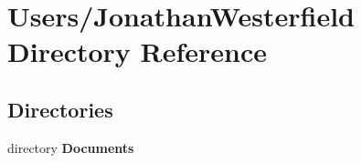 \section{Users/\+Jonathan\+Westerfield Directory Reference}
\label{dir_3ce1afc6f4ddb0f62f9b760af6e1f717}
\subsection*{Directories}
\begin{DoxyCompactItemize}
\item 
directory {\bf Documents}
\end{DoxyCompactItemize}
